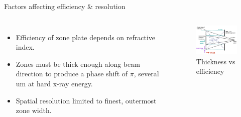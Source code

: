 \documentclass{beamer}
\begin{document}
\begin{frame}{Factors affecting efficiency \& resolution}
	\begin{block}{}
		\begin{columns}[onlytextwidth,T]
			\column{\dimexpr\linewidth-30mm-10mm}
			\begin{itemize}
				\item Efficiency of zone plate depends on refractive index.
				\item Zones must be thick enough along beam direction to produce a phase shift of $\pi$, several um at hard x-ray energy.
				\item Spatial resolution limited to finest, outermost zone width.
			\end{itemize}
			\column{30mm}
			\begin{figure}
				\hspace*{-1.1cm}\includegraphics[width=50mm]{zp_chris}
				\caption{Thickness vs efficiency \footnotemark}
			\end{figure}
		\end{columns}
	\end{block}
\end{frame}
\end{document}
